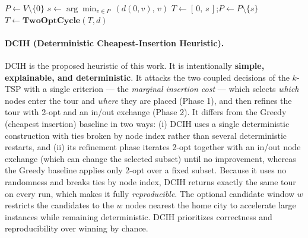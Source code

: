 \documentclass[conference]{IEEEtran}
\begin{document}
\FloatBarrier
\begin{algorithm}[H]
\small
\DontPrintSemicolon
{}
\SetInd{0.5em}{0.8em}
\caption{DCIH (Deterministic Cheapest-Insertion Heuristic) for the $k$-TSP}\label{alg:dci}


$P \leftarrow V\setminus\{0\}$\;
$s \leftarrow \arg\min_{v\in P}\,(d(0,v),\,v)$ 
$T \leftarrow [\,0,\,s\,]$;\quad $P\leftarrow P\setminus\{s\}$\;
$T \leftarrow \textbf{TwoOptCycle}(T,d)$\;
\;
\end{algorithm}
\FloatBarrier

\paragraph{DCIH (Deterministic Cheapest-Insertion Heuristic).}
DCIH is the proposed heuristic of this work. It is intentionally \textbf{simple, explainable, and deterministic}. It attacks the two coupled decisions of the $k$-TSP with a single criterion --- the \emph{marginal insertion cost} --- which selects \emph{which} nodes enter the tour and \emph{where} they are placed (Phase 1), and then refines the tour with 2-opt and an in/out exchange (Phase 2). It differs from the Greedy (cheapest insertion) baseline in two ways: (i) DCIH uses a single deterministic construction with ties broken by node index rather than several deterministic restarts, and (ii) its refinement phase iterates 2-opt together with an in/out node exchange (which can change the selected subset) until no improvement, whereas the Greedy baseline applies only 2-opt over a fixed subset. Because it uses no randomness and breaks ties by node index, DCIH returns exactly the same tour on every run, which makes it fully \emph{reproducible}. The optional candidate window $w$ restricts the candidates to the $w$ nodes nearest the home city to accelerate large instances while remaining deterministic. DCIH prioritizes correctness and reproducibility over winning by chance.
\end{document}
